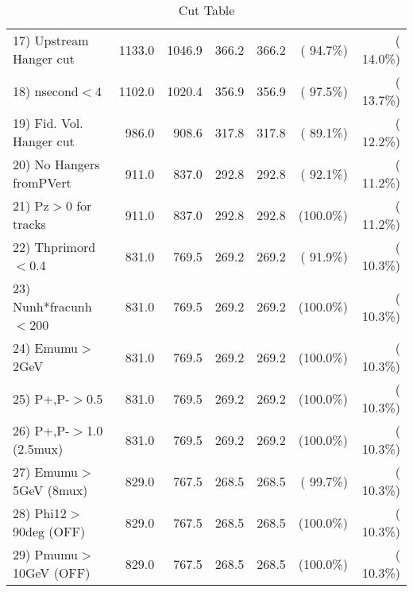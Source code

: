 \begin{table}[h!]
\begin{tabular}{||l||r|r|r|r|r|r||}
 17) Upstream Hanger cut  &       1133.0 &       1046.9 &        366.2 &        366.2 & ( 94.7\%) & ( 14.0\%) \\
 18) nsecond$<$4          &       1102.0 &       1020.4 &        356.9 &        356.9 & ( 97.5\%) & ( 13.7\%) \\
 19) Fid. Vol. Hanger cut &        986.0 &        908.6 &        317.8 &        317.8 & ( 89.1\%) & ( 12.2\%) \\
 20) No Hangers fromPVert &        911.0 &        837.0 &        292.8 &        292.8 & ( 92.1\%) & ( 11.2\%) \\
 21) Pz$>$0 for tracks    &        911.0 &        837.0 &        292.8 &        292.8 & (100.0\%) & ( 11.2\%) \\
 22) Thprimord$<$0.4      &        831.0 &        769.5 &        269.2 &        269.2 & ( 91.9\%) & ( 10.3\%) \\
 23) Nunh*fracunh$<$200   &        831.0 &        769.5 &        269.2 &        269.2 & (100.0\%) & ( 10.3\%) \\
 24) Emumu$>$2GeV         &        831.0 &        769.5 &        269.2 &        269.2 & (100.0\%) & ( 10.3\%) \\
 25) P+,P-$>$0.5          &        831.0 &        769.5 &        269.2 &        269.2 & (100.0\%) & ( 10.3\%) \\
 26) P+,P-$>$1.0 (2.5mux) &        831.0 &        769.5 &        269.2 &        269.2 & (100.0\%) & ( 10.3\%) \\
 27) Emumu$>$5GeV  (8mux) &        829.0 &        767.5 &        268.5 &        268.5 & ( 99.7\%) & ( 10.3\%) \\
 28) Phi12$>$90deg  (OFF) &        829.0 &        767.5 &        268.5 &        268.5 & (100.0\%) & ( 10.3\%) \\
 29) Pmumu$>$10GeV  (OFF) &        829.0 &        767.5 &        268.5 &        268.5 & (100.0\%) & ( 10.3\%) \\
 \hline
 \hline
 \end{tabular}
 \caption{Cut Table           }
 \label{tab-cutcohjpsi-mumu_ccdis}
 \end{table}
